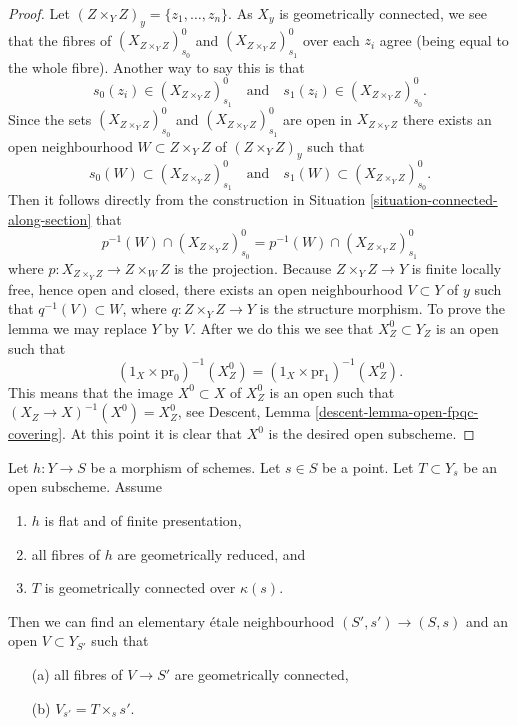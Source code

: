 \begin{proof}
\medskip\noindent
Let $(Z \times_Y Z)_y = \{z_1, \ldots, z_n\}$.
As $X_y$ is geometrically connected, we see that the fibres of
$(X_{Z \times_Y Z})_{s_0}^0$ and $(X_{Z \times_Y Z})_{s_1}^0$
over each $z_i$ agree (being equal to the whole fibre). Another
way to say this is that
$$
s_0(z_i) \in (X_{Z \times_Y Z})_{s_1}^0
\quad\text{and}\quad
s_1(z_i) \in (X_{Z \times_Y Z})_{s_0}^0.
$$
Since the sets $(X_{Z \times_Y Z})_{s_0}^0$ and $(X_{Z \times_Y Z})_{s_1}^0$
are open in $X_{Z \times_Y Z}$ there exists an open neighbourhood
$W \subset Z \times_Y Z$ of $(Z \times_Y Z)_y$ such that
$$
s_0(W) \subset (X_{Z \times_Y Z})_{s_1}^0
\quad\text{and}\quad
s_1(W) \subset (X_{Z \times_Y Z})_{s_0}^0.
$$
Then it follows directly from the construction in
Situation \ref{situation-connected-along-section}
that
$$
p^{-1}(W) \cap (X_{Z \times_Y Z})_{s_0}^0
=
p^{-1}(W) \cap (X_{Z \times_Y Z})_{s_1}^0
$$
where $p : X_{Z \times_Y Z} \to Z \times_W Z$ is the projection.
Because $Z \times_Y Z \to Y$ is finite locally free, hence open and closed,
there exists an open neighbourhood $V \subset Y$ of $y$ such that
$q^{-1}(V) \subset W$, where $q : Z \times_Y Z \to Y$ is the
structure morphism. To prove the lemma we may replace $Y$ by $V$.
After we do this we see that $X_Z^0 \subset Y_Z$ is an open such that
$$
(1_X \times \text{pr}_0)^{-1}(X_Z^0) =
(1_X \times \text{pr}_1)^{-1}(X_Z^0).
$$
This means that the image $X^0 \subset X$ of $X_Z^0$ is an open such
that $(X_Z \to X)^{-1}(X^0) = X_Z^0$, see
Descent, Lemma \ref{descent-lemma-open-fpqc-covering}.
At this point it is clear that $X^0$ is the desired open subscheme.
\end{proof}

\begin{lemma}
\label{lemma-fibre-geometrically-connected-reduced}
Let $h : Y \to S$ be a morphism of schemes.
Let $s \in S$ be a point.
Let $T \subset Y_s$ be an open subscheme.
Assume
\begin{enumerate}
\item $h$ is flat and of finite presentation,
\item all fibres of $h$ are geometrically reduced, and
\item $T$ is geometrically connected over $\kappa(s)$.
\end{enumerate}
Then we can find an elementary \'etale neighbourhood $(S', s') \to (S, s)$
and an open $V \subset Y_{S'}$ such that
\begin{enumerate}
\item[(a)] all fibres of $V \to S'$ are geometrically connected,
\item[(b)] $V_{s'} = T \times_s s'$.
\end{enumerate}
\end{lemma}

